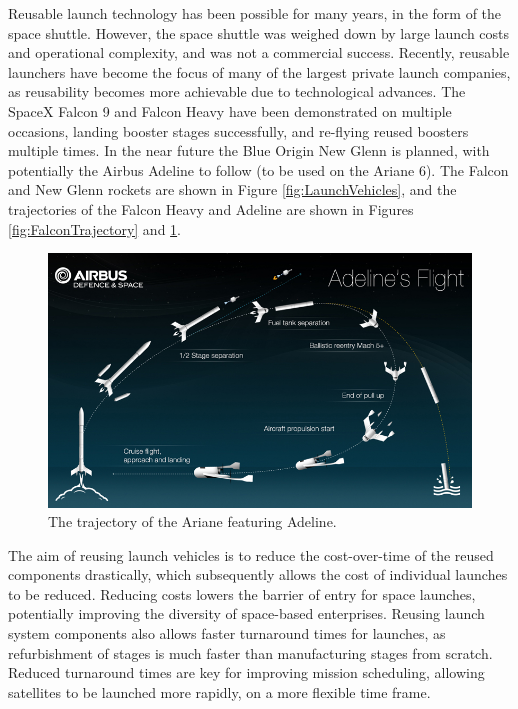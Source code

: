   Reusable launch technology has been possible for many years, in the form of the space shuttle. However, the space shuttle was weighed down by large launch costs and operational complexity, and was not a commercial success\cite{Launius2006}. Recently, reusable launchers have become the focus of many of the largest private launch companies, as reusability becomes more achievable due to technological advances\cite{Foust2018,Mosher2018}. The SpaceX Falcon 9 and Falcon Heavy have been demonstrated on multiple occasions, landing booster stages successfully, and re-flying reused boosters multiple times\cite{Foust2018}. In the near future the Blue Origin New Glenn is planned\cite{Foust2018}, with potentially the Airbus Adeline to follow (to be used on the Ariane 6)\cite{Adeline}. The Falcon and New Glenn rockets are shown in Figure \ref{fig:LaunchVehicles}, and the trajectories of the Falcon Heavy and Adeline are shown in Figures \ref{fig:FalconTrajectory} and \ref{fig:visuel_adeline1}.  

  
 
  
  
  
  \begin{figure}[ht]
  	\centering
  	\includegraphics[width=0.7\linewidth]{figures/2_literature-review/visuel_adeline1}
  	\caption{The trajectory of the Ariane featuring Adeline\cite{Adelineb}.}
  	\label{fig:visuel_adeline1}
  \end{figure}
  
       The aim of reusing launch vehicles is to reduce the cost-over-time of the reused components drastically, which subsequently allows the cost of individual launches to be reduced\cite{RichardWebb2016}. Reducing costs lowers the barrier of entry for space launches, potentially improving the diversity of space-based enterprises. 
       Reusing launch system components also allows faster turnaround times for launches, as refurbishment of stages is much faster than manufacturing stages from scratch. Reduced turnaround times are key for improving mission scheduling, allowing satellites to be launched more rapidly, on a more flexible time frame. 
  
